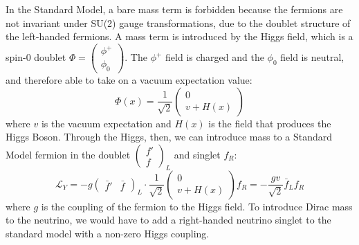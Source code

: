 \documentclass[/main.tex]{subfiles}
\begin{document}
In the Standard Model, a bare mass term is forbidden because the fermions are not invariant under SU(2) gauge transformations, due to the doublet structure of the left-handed fermions.
A mass term is introduced by the Higgs field, which is a spin-0 doublet $\Phi=\begin{pmatrix} \phi^+ \\ \phi_0\end{pmatrix}$.
The $\phi^+$ field is charged and the $\phi_0$ field is neutral, and therefore able to take on a vacuum expectation value:
\begin{equation}
  \Phi(x)=\frac{1}{\sqrt{2}}\begin{pmatrix}  0\\ v+H(x)\end{pmatrix}
\end{equation}
where $v$ is the vacuum expectation and $H(x)$ is the field that produces the Higgs Boson.
Through the Higgs, then, we can introduce mass to a Standard Model fermion in the doublet $\begin{pmatrix}f' \\ f\end{pmatrix}_L$ and singlet $f_R$:
\begin{equation}
  \mathcal{L}_{Y}=-g\begin{pmatrix}\bar f' & \bar f\end{pmatrix}_L \cdot\frac{1}{\sqrt{2}}\begin{pmatrix}0 \\ v+H(x)\end{pmatrix} f_R = -\frac{gv}{\sqrt{2}}\bar f_Lf_R
\end{equation}
where $g$ is the coupling of the fermion to the Higgs field.
To introduce Dirac mass to the neutrino, we would have to add a right-handed neutrino singlet to the standard model with a non-zero Higgs coupling.
\end{document}
